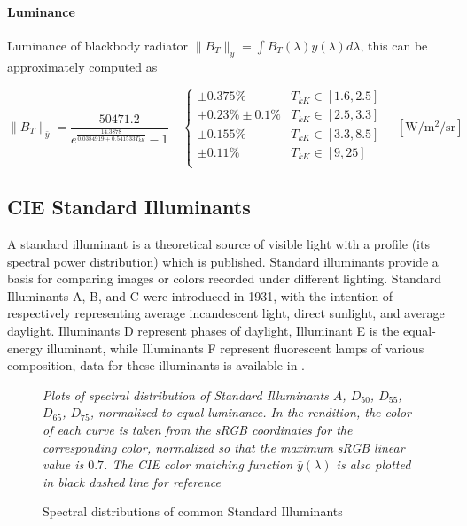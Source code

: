 \paragraph{Luminance}

Luminance of blackbody radiator $\|B_T\|_{\bar y} = \int B_T(\lambda)\bar y(\lambda) d\lambda$,
this can be approximately computed as

\begin{equation}
\|B_T\|_{\bar y} = \frac{\num{50471.2}}{e^{\frac{14.3878}{\num{0.0384919} +
\num{0.541533} T_{kK}}}-1}
\quad \left\{\begin{array}{cl}
\pm 0.375\% & T_{kK} \in [1.6, 2.5] \\
+0.23\% \pm 0.1\% & T_{kK} \in [2.5, 3.3] \\
\pm 0.155\% & T_{kK} \in [3.3, 8.5] \\
\pm 0.11\%  & T_{kK} \in [9, 25] \\
\end{array}\right.
\quad \left[\si{\watt\per\square\meter\per\steradian}\right]
\end{equation}

\subsection{CIE Standard Illuminants}

A standard illuminant is a theoretical source of visible light with a profile
(its spectral
power distribution) which is published. Standard illuminants provide a basis for
comparing
images or colors recorded under different lighting. Standard Illuminants A, B,
and C were
introduced in 1931, with the intention of respectively representing average
incandescent light,
direct sunlight, and average daylight. Illuminants D represent phases of
daylight, Illuminant E
is the equal-energy illuminant, while Illuminants F represent fluorescent lamps
of various
composition, data for these illuminants is available in \cite{stdilluminants}.

\begin{figure}
{
\small
\centering

\caption{Spectral distributions of common Standard Illuminants}
\label{fig:illumspectra}
}
\vskip 1mm
{\footnotesize\it Plots of spectral distribution of
Standard Illuminants $A$, $D_{50}$, $D_{55}$, $D_{65}$, $D_{75}$,
normalized to equal luminance.
In the rendition, the color of each curve is taken from the
sRGB coordinates for the corresponding color,
normalized so that the maximum sRGB linear value is $0.7$.
The CIE color matching function $\bar y (\lambda)$ is also plotted in
black dashed line for reference}
\end{figure}

